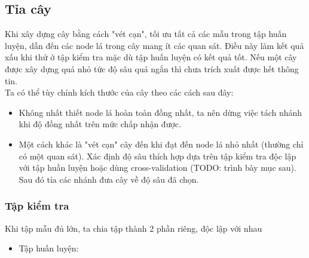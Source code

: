 \subsection{Tỉa cây}
Khi xây dựng cây bằng cách "vét cạn", tối ưu tất cả các mẫu trong tập huấn luyện, dẫn đến các node lá trong cây mang ít các quan sát. Điều này làm kết quả xấu khi thử ở tập kiểm tra mặc dù tập huấn luyện có kết quả tốt. Nếu một cây được xây dựng quá nhỏ tức độ sâu quá ngắn thì chưa trích xuất được hết thông tin.\\
Ta có thể tùy chỉnh kích thước của cây theo các cách sau đây:
\begin{itemize}
\item Không nhất thiết node lá hoàn toàn đồng nhất, ta nên dừng việc tách nhánh khi độ đồng nhất trên mức chấp nhận được.
\item Một cách khác là "vét cạn" cây đến khi đạt đến node lá nhỏ nhất (thường chỉ có một quan sát). Xác định độ sâu thích hợp dựa trên tập kiểm tra độc lập với tập huần luyện  hoặc dùng cross-validation (TODO: trình bày mục sau). Sau đó tỉa các nhánh đưa cây về độ sâu đã chọn.
\end{itemize}


\subsubsection{Tập kiểm tra}
Khi tập mẫu đủ lớn, ta chia tập thành 2 phần riêng, độc lập với nhau 
\begin{itemize}
\item Tập huấn luyện: 
\end{itemize}

